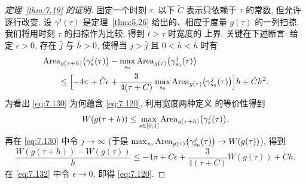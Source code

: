 \begin{proof}[定理~\ref{thm:7.19} 的证明]
固定一个时刻 $\tau$. 以下 $\tilde{C}$ 表示只依赖于 $\tau$ 的常数, 但允许
逐行改变. 设 $\gamma^j(\tau)$ 是定理~\ref{thm:5.26} 给出的、相应于度量 $g(\tau)$
的一列扫掠. 我们将用时刻 $\tau$ 的扫掠作为比较, 得到 $t>\tau$ 时宽度的
上界. 关键在下述断言: 给定 $\epsilon>0$, 存在 $\bar{j}$ 与 $\bar{h}>0$,
使得当 $j>\bar{j}$ 且 $0<h<\bar{h}$ 时有
\begin{equation}
\begin{aligned}
&\operatorname{Area}_{g(\tau+h)}\bigl(\gamma_s^j(\tau)\bigr)
-\max_{s_0}\operatorname{Area}_{g(\tau)}\bigl(\gamma_{s_0}^j(\tau)\bigr)\\
&\qquad\leq\Bigl[-4\pi+\tilde{C}\epsilon
+\frac3{4(\tau+C)}\max_{s_0}\operatorname{Area}_{g(\tau)}
\bigl(\gamma_{s_0}^j(\tau)\bigr)\Bigr]h+\tilde{C}h^2.
\end{aligned}
\label{eq:7.130}
\end{equation}
为看出 \eqref{eq:7.130} 为何蕴含 \eqref{eq:7.120}, 利用宽度两种定义
的等价性得到
\begin{equation}
W(g(\tau+h))
\leq\max_{s\in[0,1]}\operatorname{Area}_{g(\tau+h)}\bigl(\gamma_s^j(\tau)\bigr),
\label{eq:7.131}
\end{equation}
再在 \eqref{eq:7.130} 中令 $j\to\infty$ (于是
$\max_{s_0}\operatorname{Area}_{g(\tau)}\bigl(\gamma_{s_0}^j(\tau)\bigr)\to W(g(\tau))$),
得到
\begin{equation}
\frac{W(g(\tau+h))-W(g(\tau))}h
\leq-4\pi+\tilde{C}\epsilon
+\frac3{4(\tau+C)}W(g(\tau))+\tilde{C}h.
\label{eq:7.132}
\end{equation}
在 \eqref{eq:7.132} 中令 $\epsilon\to0$, 即得 \eqref{eq:7.120}.


\end{proof}
